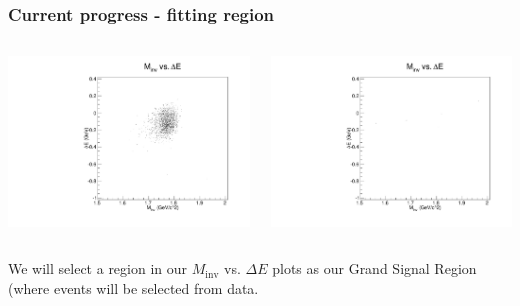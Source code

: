 \documentclass[xcolor=table]{beamer}
\begin{document}
\begin{frame}
\frametitle{Current progress - fitting region}

\begin{columns}
\begin{column}{0.5\textwidth}
\begin{center}
\includegraphics[width=\textwidth]{images/deltaE_vs_Minv_SIG.pdf}
\end{center}
\end{column}

\begin{column}{0.5\textwidth}
\begin{center}
\includegraphics[width=\textwidth]{images/deltaE_vs_Minv_BG.pdf}
\end{center}
\end{column}

\end{columns}

We will select a region in our $M_{\text{inv}}$ vs. $\Delta E$ plots as our Grand Signal Region (where events will be selected from data.

\end{frame}
\end{document}
